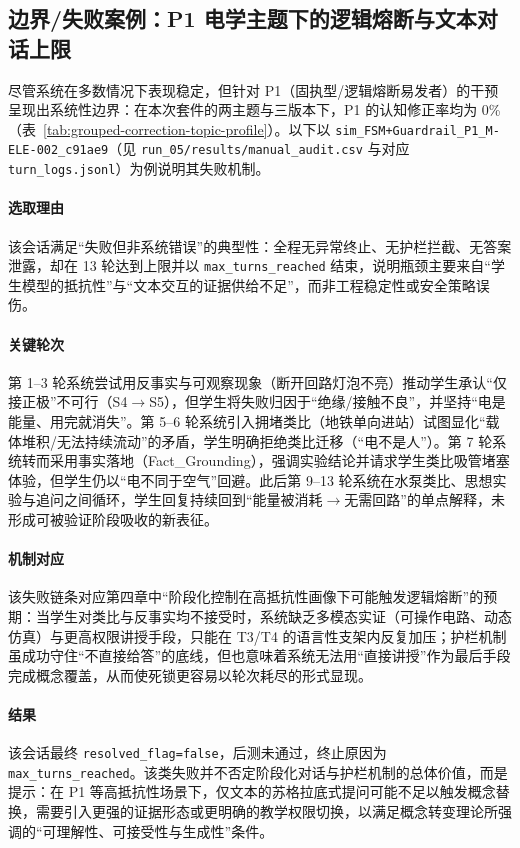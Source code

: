 \subsection{边界/失败案例：P1 电学主题下的逻辑熔断与文本对话上限}
\label{subsec:5.4.3}

尽管系统在多数情况下表现稳定，但针对 P1（固执型/逻辑熔断易发者）的干预呈现出系统性边界：在本次套件的两主题与三版本下，P1 的认知修正率均为 0\%（表~\ref{tab:grouped-correction-topic-profile}）。以下以 \texttt{sim\_FSM+Guardrail\_P1\_M-ELE-002\_c91ae9}（见 \texttt{run\_05/results/manual\_audit.csv} 与对应 \texttt{turn\_logs.jsonl}）为例说明其失败机制。

\paragraph{选取理由}该会话满足“失败但非系统错误”的典型性：全程无异常终止、无护栏拦截、无答案泄露，却在 13 轮达到上限并以 \texttt{max\_turns\_reached} 结束，说明瓶颈主要来自“学生模型的抵抗性”与“文本交互的证据供给不足”，而非工程稳定性或安全策略误伤。

\paragraph{关键轮次}第 1--3 轮系统尝试用反事实与可观察现象（断开回路灯泡不亮）推动学生承认“仅接正极”不可行（S4$\rightarrow$S5），但学生将失败归因于“绝缘/接触不良”，并坚持“电是能量、用完就消失”。第 5--6 轮系统引入拥堵类比（地铁单向进站）试图显化“载体堆积/无法持续流动”的矛盾，学生明确拒绝类比迁移（“电不是人”）。第 7 轮系统转而采用事实落地（Fact\_Grounding），强调实验结论并请求学生类比吸管堵塞体验，但学生仍以“电不同于空气”回避。此后第 9--13 轮系统在水泵类比、思想实验与追问之间循环，学生回复持续回到“能量被消耗$\rightarrow$无需回路”的单点解释，未形成可被验证阶段吸收的新表征。

\paragraph{机制对应}该失败链条对应第四章中“阶段化控制在高抵抗性画像下可能触发逻辑熔断”的预期：当学生对类比与反事实均不接受时，系统缺乏多模态实证（可操作电路、动态仿真）与更高权限讲授手段，只能在 T3/T4 的语言性支架内反复加压；护栏机制虽成功守住“不直接给答”的底线，但也意味着系统无法用“直接讲授”作为最后手段完成概念覆盖，从而使死锁更容易以轮次耗尽的形式显现。

\paragraph{结果}该会话最终 \texttt{resolved\_flag=false}，后测未通过，终止原因为 \texttt{max\_turns\_reached}。该类失败并不否定阶段化对话与护栏机制的总体价值，而是提示：在 P1 等高抵抗性场景下，仅文本的苏格拉底式提问可能不足以触发概念替换，需要引入更强的证据形态或更明确的教学权限切换，以满足概念转变理论所强调的“可理解性、可接受性与生成性”条件\cite{posner1982accommodation,chi1994things}。

